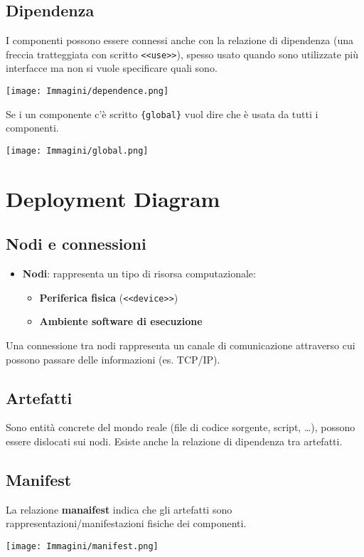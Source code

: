 \documentclass[12pt, a4paper]{report}
\begin{document}
\subsection{Dipendenza}
I componenti possono essere connessi anche con la relazione di dipendenza (una freccia tratteggiata con scritto \texttt{<<use>>}), spesso usato quando sono utilizzate più interfacce ma non si vuole specificare quali sono.
\begin{center}
    \texttt{[image: Immagini/dependence.png]}
\end{center}
Se i un componente c'è scritto \texttt{\{global\}} vuol dire che è usata da tutti i componenti.
\begin{center}
    \texttt{[image: Immagini/global.png]}
\end{center}
\section{Deployment Diagram}
\subsection{Nodi e connessioni}
\begin{itemize}
    \item \textbf{Nodi}: rappresenta un tipo di risorsa computazionale: \begin{itemize}
        \item \textbf{Periferica fisica} (\texttt{<<device>>})
        \item \textbf{Ambiente software di esecuzione}
    \end{itemize}
\end{itemize}
Una connessione tra nodi rappresenta un canale di comunicazione attraverso cui possono passare delle informazioni (es. TCP/IP).
\subsection{Artefatti}
Sono entità concrete del mondo reale (file di codice sorgente, script, \dots),  possono essere dislocati sui nodi. Esiste anche la relazione di dipendenza tra artefatti.
\subsection{Manifest}
La relazione \textbf{manaifest} indica che gli artefatti sono rappresentazioni/manifestazioni fisiche dei componenti.
\begin{center}
    \texttt{[image: Immagini/manifest.png]}
\end{center}
\end{document}
